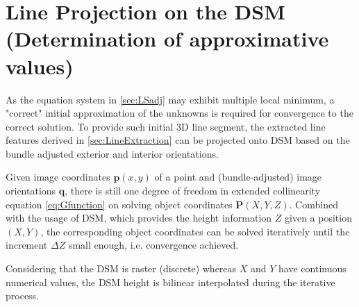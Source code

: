 







\section{Line Projection on the DSM (Determination of approximative values)}
\label{sec:LineProjectionOnDSM}

As the equation system in \cref{sec:LSadj} may exhibit multiple local minimum, a "correct" initial approximation of the unknowns is required for convergence to the correct solution. To provide such initial 3D line segment, the extracted line features derived in \cref{sec:LineExtraction} can be projected onto DSM based on the bundle adjusted exterior and interior orientations.

Given image coordinates $\mathbf{p}(x,y)$ of a point and (bundle-adjusted) image orientations $\mathbf{q}$, there is still one degree of freedom in extended collinearity equation \eqref{eq:Gfunction} on solving object coordinates $\mathbf{P}(X,Y,Z)$. Combined with the usage of DSM, which provides the height information $Z$ given a position $(X,Y)$, the corresponding object coordinates can be solved iteratively until the increment $\Delta Z$ small enough, i.e. convergence achieved. %

Considering that the DSM is raster (discrete) whereas $X$ and $Y$ have continuous numerical values, the DSM height is bilinear interpolated during the iterative process.




